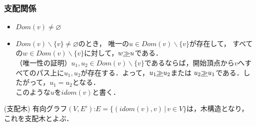 \documentclass[ckj,dvipdfmx]{beamer}
\begin{document}
\begin{frame}
  \frametitle{支配関係}

  \begin{itemize}
    \item $Dom(v)\not=\varnothing$
    \item $Dom(v)\backslash\{v\}\not=\varnothing$のとき，
          唯一の$u\in Dom(v)\backslash\{v\}$が存在して，
          すべての$w\in Dom(v)\backslash\{v\}$に対して，$w\underline{\gg} u$である．\\
          （唯一性の証明）$u_1,u_2\in Dom(v)\backslash\{v\}$であるならば，開始頂点から$v$へすべてのパス上に$u_1,u_2$が存在する．よって，$u_1\underline{\gg} u_2$または
          $u_2\underline{\gg} u_1$である．したがって，$u_1=u_2$となる．\\
          このような$u$を$idom(v)$と書く．
  \end{itemize}

  \begin{itembox}[l]{(支配木)}
    有向グラフ$(V,E')$:$E=\{(idom(v),v)\,|\,v\in V\}$は，木構造となり，
    これを支配木とよぶ．
  \end{itembox}
\end{frame}
\end{document}
